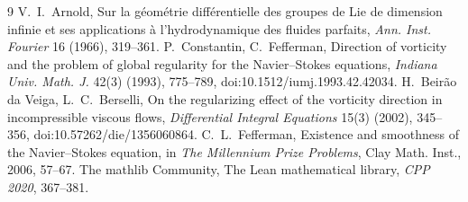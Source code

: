 \documentclass[11pt]{article}
\theoremstyle{definition}
\theoremstyle{remark}
\begin{document}
\begin{thebibliography}{9}
 V.~I.~Arnold, Sur la géométrie différentielle des groupes de
Lie de dimension infinie et ses applications à l'hydrodynamique des fluides
parfaits, \emph{Ann. Inst. Fourier} 16 (1966), 319--361.
 P.~Constantin, C.~Fefferman, Direction of vorticity and the
problem of global regularity for the Navier--Stokes equations,
\emph{Indiana Univ. Math. J.} 42(3) (1993), 775--789,
doi:10.1512/iumj.1993.42.42034.
 H.~Beirão da Veiga, L.~C.~Berselli, On the regularizing effect
of the vorticity direction in incompressible viscous flows,
\emph{Differential Integral Equations} 15(3) (2002), 345--356,
doi:10.57262/die/1356060864.
 C.~L.~Fefferman, Existence and smoothness of the
Navier--Stokes equation, in \emph{The Millennium Prize Problems}, Clay Math.
Inst., 2006, 57--67.
 The mathlib Community, The Lean mathematical library,
\emph{CPP 2020}, 367--381.
\end{thebibliography}
\end{document}
